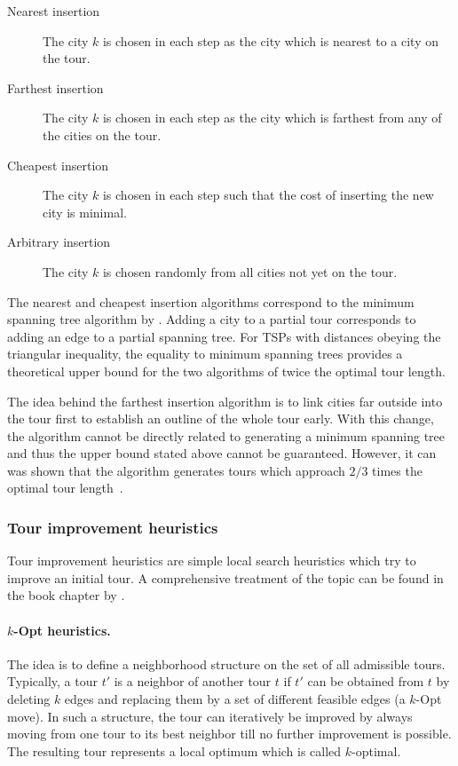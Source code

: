 \documentclass[10pt,a4paper,fleqn]{article}
\begin{document}
\begin{description}
\item[Nearest insertion] The city $k$ is chosen in each step as
the city which is nearest to a city on the tour.

\item[Farthest insertion] The city $k$ is chosen in each step as
the city which is farthest from any of the cities on the tour.

\item[Cheapest insertion] The city $k$ is chosen in each step 
such that the cost of inserting the new city is minimal.

\item[Arbitrary insertion] The city $k$ is chosen randomly from all cities
not yet on the tour.

\end{description}


The nearest and cheapest insertion algorithms correspond to the minimum
spanning tree algorithm by \cite{Prim1957}. Adding a city to a partial tour
corresponds to adding an edge to a partial spanning tree. For TSPs with
distances obeying the triangular inequality, the equality to minimum spanning
trees provides a theoretical upper bound for the two algorithms of twice the
optimal tour length.

The idea behind the farthest insertion algorithm is to link cities far
outside into the tour first to establish an outline of the whole tour
early. With this change, the algorithm cannot be directly related to
generating a minimum spanning tree and thus the upper bound stated above
cannot be guaranteed.  However, it can was shown that the algorithm
generates tours which approach $2/3$ times the optimal tour
length~\citep{Johnson1985}.

\subsubsection{Tour improvement heuristics}

Tour improvement heuristics are simple local search heuristics which try to
improve an initial tour. A comprehensive treatment of the topic
can be found in the book chapter by \cite{Rego2002}.

\paragraph{$k$-Opt heuristics.} The idea is to define a neighborhood structure
on the set of all admissible tours. Typically, a tour $t'$ is a neighbor of
another tour $t$ if $t'$ can be obtained from $t$ by deleting $k$ edges
and replacing them by a set of different feasible edges (a $k$-Opt move).  In
such a structure, the tour can iteratively be improved by always moving from
one tour to its best neighbor till no further improvement is possible. The
resulting tour represents a local optimum which is called $k$-optimal.
\end{document}
